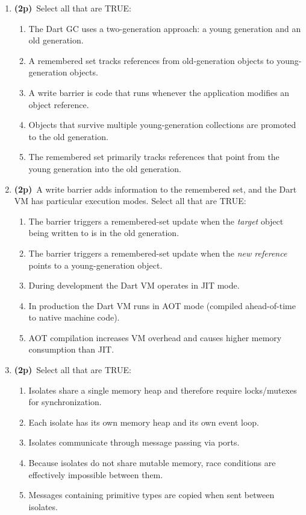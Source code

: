 \documentclass[11pt]{article}
\newcommand{\pts}{\textbf{(2p)}~}
\begin{document}
\begin{enumerate}
    \item \pts Select all that are TRUE:
    \begin{enumerate}
      \item The Dart GC uses a two-generation approach: a young generation and an old generation.
      \item A remembered set tracks references from old-generation objects to young-generation objects.
      \item A write barrier is code that runs whenever the application modifies an object reference.
      \item Objects that survive multiple young-generation collections are promoted to the old generation.
      \item The remembered set primarily tracks references that point from the young generation into the old generation.
    \end{enumerate}

    \item \pts A write barrier adds information to the remembered set, and the Dart VM has particular execution modes. Select all that are TRUE:
    \begin{enumerate}
      \item The barrier triggers a remembered-set update when the \emph{target} object being written to is in the old generation.
      \item The barrier triggers a remembered-set update when the \emph{new reference} points to a young-generation object.
      \item During development the Dart VM operates in JIT mode.
      \item In production the Dart VM runs in AOT mode (compiled ahead-of-time to native machine code).
      \item AOT compilation increases VM overhead and causes higher memory consumption than JIT.
    \end{enumerate}

    \item \pts Select all that are TRUE:
    \begin{enumerate}
      \item Isolates share a single memory heap and therefore require locks/mutexes for synchronization.
      \item Each isolate has its own memory heap and its own event loop.
      \item Isolates communicate through message passing via ports.
      \item Because isolates do not share mutable memory, race conditions are effectively impossible between them.
      \item Messages containing primitive types are copied when sent between isolates.
    \end{enumerate}


\end{enumerate}
\end{document}
